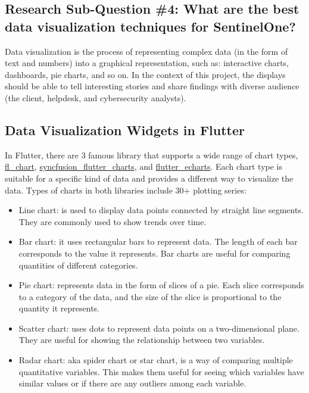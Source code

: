 \begin{multicols}{2}
      \section{Research Sub-Question \#4: What are the best data visualization techniques for SentinelOne?}
      Data visualization is the process of representing complex data (in the form of text and numbers) into a
      graphical representation, such as: interactive charts, dashboards, pie charts, and so on. In the context
      of this project, the displays should be able to tell interesting stories and share findings with diverse
      audience (the client, helpdesk, and cybersecurity analysts).

      \subsection{Data Visualization Widgets in Flutter}
      In Flutter, there are 3 famous library that supports a wide range of chart types,
      \href{https://pub.dev/packages/fl_chart}{fl\_chart},
      \href{https://pub.dev/packages/syncfusion_flutter_charts}{syncfusion\_flutter\_charts}, and
      \href{https://pub.dev/packages/flutter_echarts}{flutter\_echarts}. Each chart type is
      suitable for a specific kind of data and provides a different way to visualize the data. Types of charts in
      both libraries include 30+ plotting series:
      \begin{itemize}
            \item Line chart: is used to display data points connected by straight line segments. They are commonly
                  used to show trends over time.
            \item Bar chart: it uses rectangular bars to represent data. The length of each bar corresponds to the
                  value it represents. Bar charts are useful for comparing quantities of different categories.
            \item Pie chart: represents data in the form of slices of a pie. Each slice corresponds to a category
                  of the data, and the size of the slice is proportional to the quantity it represents.
            \item Scatter chart: uses dots to represent data points on a two-dimensional plane. They are useful
                  for showing the relationship between two variables.
            \item Radar chart: \acrshort{aka} spider chart or star chart, is a way of comparing multiple
                  quantitative variables. This makes them useful for seeing which variables have similar values
                  or if there are any outliers among each variable.
      \end{itemize}
\end{multicols}


